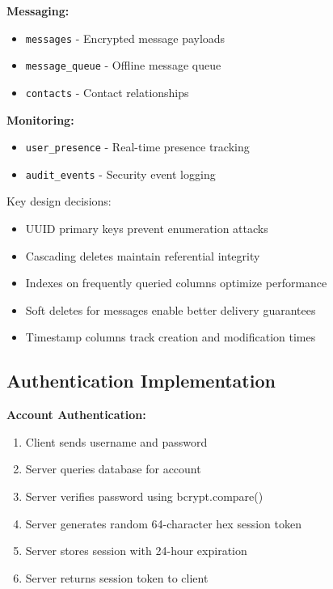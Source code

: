 \textbf{Messaging:}
\begin{itemize}
    \item \texttt{messages} - Encrypted message payloads
    \item \texttt{message\_queue} - Offline message queue
    \item \texttt{contacts} - Contact relationships
\end{itemize}

\textbf{Monitoring:}
\begin{itemize}
    \item \texttt{user\_presence} - Real-time presence tracking
    \item \texttt{audit\_events} - Security event logging
\end{itemize}

Key design decisions:
\begin{itemize}
    \item UUID primary keys prevent enumeration attacks
    \item Cascading deletes maintain referential integrity
    \item Indexes on frequently queried columns optimize performance
    \item Soft deletes for messages enable better delivery guarantees
    \item Timestamp columns track creation and modification times
\end{itemize}

\subsection{Authentication Implementation}

\textbf{Account Authentication:}
\begin{enumerate}
    \item Client sends username and password
    \item Server queries database for account
    \item Server verifies password using bcrypt.compare()
    \item Server generates random 64-character hex session token
    \item Server stores session with 24-hour expiration
    \item Server returns session token to client
\end{enumerate}

